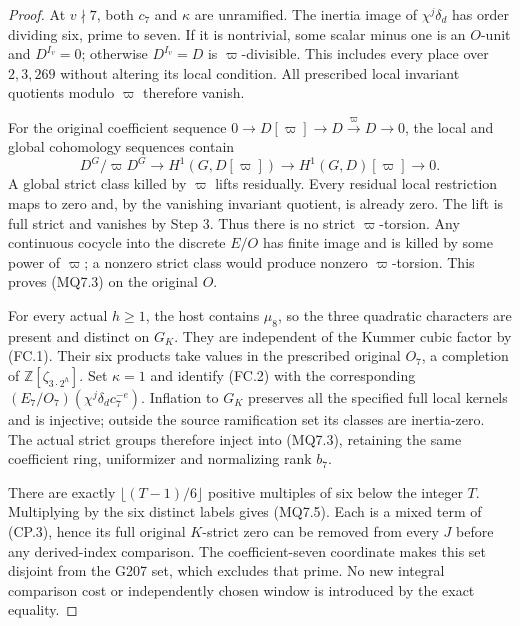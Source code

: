 \begin{proof}
At $v\nmid7$, both $c_7$ and $\kappa$ are unramified.
The inertia image of $\chi^j\delta_d$ has order dividing
six, prime to seven.  If it is nontrivial, some scalar
minus one is an $O$-unit and $D^{I_v}=0$; otherwise
$D^{I_v}=D$ is $\varpi$-divisible.  This includes every
place over $2,3,269$ without altering its local condition.
All prescribed local invariant quotients modulo $\varpi$
therefore vanish.

For the original coefficient sequence
$0\to D[\varpi]\to D\xrightarrow{\varpi}D\to0$,
the local and global cohomology sequences contain
\[
 D^G/\varpi D^G\longrightarrow H^1(G,D[\varpi])
          \longrightarrow H^1(G,D)[\varpi]\longrightarrow0.
 \tag{MQ7.18}
\]
A global strict class killed by $\varpi$ lifts residually.
Every residual local restriction maps to zero and, by the
vanishing invariant quotient, is already zero.  The lift
is full strict and vanishes by Step 3.  Thus there is no
strict $\varpi$-torsion.  Any continuous cocycle into the
discrete $E/O$ has finite image and is killed by some power
of $\varpi$; a nonzero strict class would produce nonzero
$\varpi$-torsion.  This proves (MQ7.3) on the original $O$.

For every actual $h\geq1$, the host contains $\mu_8$,
so the three quadratic characters are present and distinct
on $G_K$.  They are independent of the Kummer cubic factor
by (FC.1).  Their six products take values in the prescribed
original $O_7$, a completion of $\mathbb Z[\zeta_{3\cdot2^h}]$.
Set $\kappa=1$ and identify (FC.2) with the corresponding
$(E_7/O_7)(\chi^j\delta_dc_7^{-e})$.
Inflation to $G_K$ preserves all the specified full local
kernels and is injective; outside the source ramification
set its classes are inertia-zero.  The actual strict groups
therefore inject into (MQ7.3), retaining the same coefficient
ring, uniformizer and normalizing rank $b_7$.

There are exactly $\lfloor(T-1)/6\rfloor$ positive multiples
of six below the integer $T$.  Multiplying by the six
distinct labels gives (MQ7.5).  Each is a mixed term of
(CP.3), hence its full original $K$-strict zero can be removed
from every $J$ before any derived-index comparison.
The coefficient-seven coordinate makes this set disjoint
from the G207 set, which excludes that prime.
No new integral comparison cost or independently chosen
window is introduced by the exact equality.
\end{proof}

